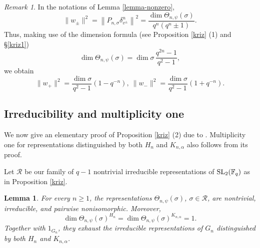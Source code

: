 \documentclass[12pt]{amsart}
\newtheorem{lemma}[theorem]{Lemma}%
\theoremstyle{definition}
\theoremstyle{remark}
\newtheorem{remark}{Remark}
\begin{document}
\begin{remark}\label{rmk-normsquared}
In the notations of Lemma \ref{lemma-nonzero}, 
\[
\|w_\pm\|^2
=\left\|P_{n,\sigma}\delta_{v^\pm}^n\right\|^2
=\frac{\dim\Theta_{n,\psi}(\sigma)}
       {q^n(q^n\pm1)}.
\]
Thus, making use of the dimension formula (see Proposition \ref{kriz} (1) and \S \ref{kriz1})
\[
\dim\Theta_{n,\psi}(\sigma)
=\dim\sigma\,\frac{q^{2n}-1}{q^2-1},
\]
we obtain
\[
\|w_+\|^2=\frac{\dim\sigma}{q^2-1}(1-q^{-n}),~
\|w_-\|^2=\frac{\dim\sigma}{q^2-1}(1+q^{-n}).
\]
\end{remark}

\subsection{Irreducibility and multiplicity one}\label{kriz2}

We now give an elementary proof of Proposition \ref{kriz} (2) due to \cite{lost10,kri24}. Multiplicity one for representations distinguished by both $H_n$ and $K_{n,\alpha}$ also follows from its proof.

Let $\mathcal R$ be our family of $q-1$ nontrivial 
irreducible representations of ${\rm SL}_2(\mathbb F_q)$ as in Proposition \ref{kriz}.

\begin{lemma}\label{lemma-kriz2}
For every $n\geq 1$, the representations
$\Theta_{n,\psi}(\sigma)$, $\sigma\in\mathcal R$, are nontrivial,
irreducible, and pairwise nonisomorphic. Moreover,
\[
\dim\Theta_{n,\psi}(\sigma)^{H_n}
=
\dim\Theta_{n,\psi}(\sigma)^{K_{n,\alpha}}
=1.
\]
Together with $1_{G_n}$, they exhaust the irreducible representations
of $G_n$ distinguished by both $H_n$ and $K_{n,\alpha}$.
\end{lemma}
\end{document}
